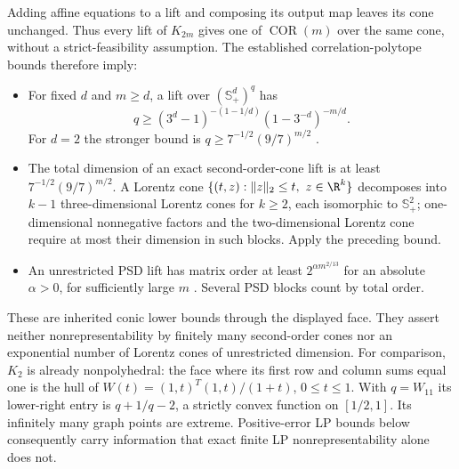 Adding affine equations to a lift and composing its output map leaves its
cone unchanged. Thus every lift of $K_{2m}$ gives one of
$\operatorname{COR}(m)$ over the same cone, without a strict-feasibility
assumption. The established correlation-polytope bounds therefore imply:
\begin{itemize}
\item For fixed $d$ and $m\ge d$, a lift over $(\mathbb S_+^d)^q$ has
\[
 q\ge(3^d-1)^{-(1-1/d)}(1-3^{-d})^{-m/d}.
\]
For $d=2$ the stronger bound is $q\ge7^{-1/2}(9/7)^{m/2}$
\citep[Theorem 1]{FawziParrilo2013}.
\item The total dimension of an exact second-order-cone lift is at least
$7^{-1/2}(9/7)^{m/2}$. A Lorentz cone
$\{(t,z):\|z\|_2\le t,\ z\in\R^k\}$ decomposes into $k-1$ three-dimensional
Lorentz cones for $k\ge2$, each isomorphic to $\mathbb S_+^2$;
one-dimensional nonnegative factors and the two-dimensional Lorentz cone
require at most their dimension in such blocks. Apply the preceding bound.
\item An unrestricted PSD lift has matrix order at least
$2^{\alpha m^{2/13}}$ for an absolute $\alpha>0$, for sufficiently large
$m$ \citep[Theorem 5.4]{LRS2015}. Several PSD blocks count by total order.
\end{itemize}
These are inherited conic lower bounds through the displayed face. They
assert neither nonrepresentability by finitely many second-order cones nor
an exponential number of Lorentz cones of unrestricted dimension.
For comparison, $K_2$ is already nonpolyhedral: the face where its first
row and column sums equal one is the hull of
$W(t)=(1,t)^T(1,t)/(1+t)$, $0\le t\le1$. With $q=W_{11}$ its lower-right
entry is $q+1/q-2$, a strictly convex function on $[1/2,1]$. Its infinitely
many graph points are extreme. Positive-error LP bounds below consequently
carry information that exact finite LP nonrepresentability alone does not.

